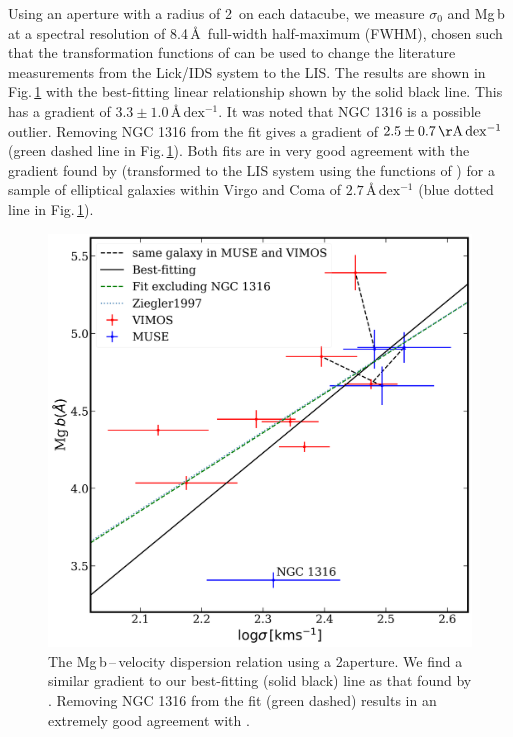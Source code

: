 \documentclass[a4paper,fleqn,usenatbib]{mnras}
\begin{document}
		Using an aperture with a radius of 2\arcsec\ on each datacube, we measure $\sigma_0$ and Mg\,b at a spectral resolution of 8.4\,\AA\ full-width half-maximum (FWHM), chosen such that the transformation functions of \citet{Vazdekis2010} can be used to change the literature measurements from the Lick/IDS system to the LIS. The results are shown in Fig.\,\ref{fig:globalMg} with the best-fitting linear relationship %
		shown by the solid black line. This has a gradient of $3.3 \pm 1.0 \,\mathrm{\text{\AA}\,dex^{-1}}$. It was noted that NGC 1316 is a possible outlier. Removing NGC 1316 from the fit gives a gradient of $2.5 \pm 0.7 \,\mathrm{\AA\,dex^{-1}}$ (green dashed line in Fig.\,\ref{fig:globalMg}). Both fits are in very good agreement with the gradient found by \citet{Ziegler1997} (transformed to the LIS system using the functions of \citealt{Vazdekis2010}) for a sample of elliptical galaxies within Virgo and Coma %
		of $2.7\,\mathrm{\text{\AA}\,dex^{-1}}$ (blue dotted line in Fig.\,\ref{fig:globalMg}).%

		\begin{figure}
			\includegraphics[width=\columnwidth]{Mg_sigma.png}
			\caption[Global Mg\,b\,--\,$\sigma$]{The Mg\,b\,--\,velocity dispersion relation using a 2\arcsec aperture. We find a similar gradient to our best-fitting (solid black) line as that found by \citet[transformed to LIS with the functions of \citealt{Vazdekis2010}; blue dotted line]{Ziegler1997}. Removing NGC 1316 from the fit (green dashed) results in an extremely good agreement with \citet{Ziegler1997}.}
			\label{fig:globalMg}
		\end{figure}
\end{document}
